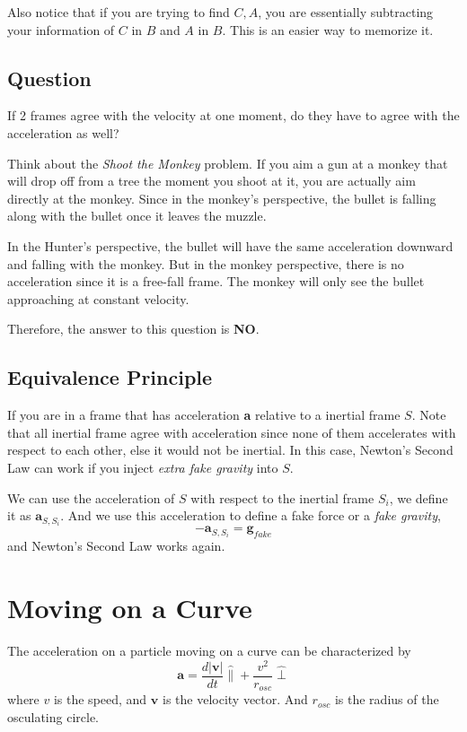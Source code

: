 \documentclass[12pt]{article}
\newcommand{\dydx}[2]{\frac{d #1}{d #2}}
\newcommand{\abso}[1]{\left|#1 \right|}
\begin{document}
Also notice that if you are trying to find $C,A$, you are essentially subtracting your information of $C$ in $B$ and $A$ in $B$. This is an easier way to memorize it. 

\subsection{Question}
If 2 frames agree with the velocity at one moment, do they have to agree with the acceleration as well?

Think about the \textit{Shoot the Monkey} problem. If you aim a gun at a monkey that will drop off from a tree the moment you shoot at it, you are actually aim directly at the monkey. Since in the monkey's perspective, the bullet is falling along with the bullet once it leaves the muzzle. 

In the Hunter's perspective, the bullet will have the same acceleration downward and falling with the monkey. But in the monkey perspective, there is no acceleration since it is a free-fall frame. The monkey will only see the bullet approaching at constant velocity. 

Therefore, the answer to this question is \textbf{NO}.

\subsection{Equivalence Principle}
If you are in a frame that has acceleration \textbf{a} relative to a inertial frame $S$. Note that all inertial frame agree with acceleration since none of them accelerates with respect to each other, else it would not be inertial. In this case, Newton's Second Law can work if you inject \textit{extra fake gravity} into $S$.

We can use the acceleration of $S$ with respect to the inertial frame $S_i$, we define it as $\mathbf{a}_{S,S_i}$. And we use this acceleration to define a fake force or a \textit{fake gravity}, 
\[
-\mathbf{a}_{S,S_i} = \mathbf{g}_{fake}
\]
and Newton's Second Law works again. 

\section{Moving on a Curve}
The acceleration on a particle moving on a curve can be characterized by
\[
\mathbf{a} = \dydx{\abso{\mathbf{v}}}{t}\hat{\parallel} + \frac{v^2}{r_{osc}}\hat{\perp}
\]
where $v$ is the speed, and $\mathbf{v}$ is the velocity vector. And $r_{osc}$ is the radius of the osculating circle.
\end{document}
